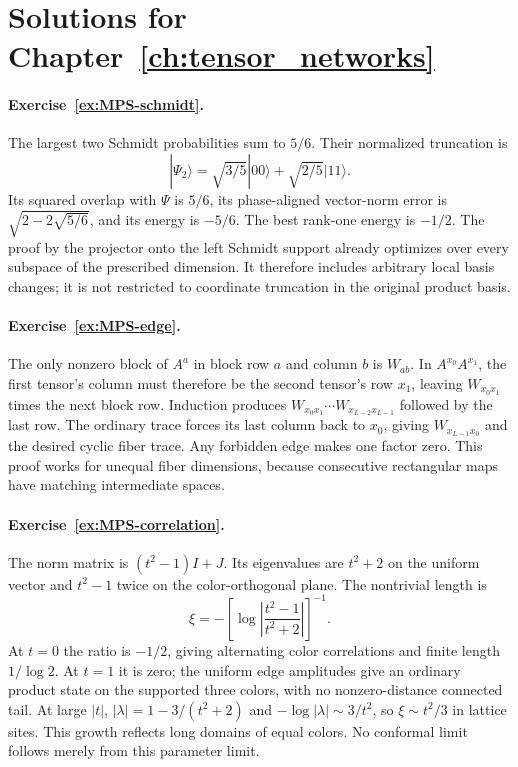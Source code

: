 \section{Solutions for Chapter~\ref{ch:tensor_networks}}

\paragraph{Exercise~\ref{ex:MPS-schmidt}.}
\label{sol:ex:MPS-schmidt}
The largest two Schmidt probabilities sum to $5/6$. Their
normalized truncation is
\[
 |\Psi_2\rangle=\sqrt{3/5}|00\rangle+\sqrt{2/5}|11\rangle.
\]
Its squared overlap with $\Psi$ is $5/6$, its phase-aligned
vector-norm error is $\sqrt{2-2\sqrt{5/6}}$, and its energy
is $-5/6$. The best rank-one energy is $-1/2$.
The proof by the projector onto the left Schmidt support
already optimizes over every subspace of the prescribed
dimension. It therefore includes arbitrary local basis
changes; it is not restricted to coordinate truncation in
the original product basis.



\paragraph{Exercise~\ref{ex:MPS-edge}.}
\label{sol:ex:MPS-edge}
The only nonzero block of $A^a$ in block row $a$ and column $b$
is $W_{ab}$. In $A^{x_0}A^{x_1}$, the first tensor's column
must therefore be the second tensor's row $x_1$, leaving
$W_{x_0x_1}$ times the next block row. Induction produces
$W_{x_0x_1}\cdots W_{x_{L-2}x_{L-1}}$ followed by the last
row. The ordinary trace forces its last column back to $x_0$,
giving $W_{x_{L-1}x_0}$ and the desired cyclic fiber trace.
Any forbidden edge makes one factor zero. This proof works
for unequal fiber dimensions, because consecutive rectangular
maps have matching intermediate spaces.



\paragraph{Exercise~\ref{ex:MPS-correlation}.}
\label{sol:ex:MPS-correlation}
The norm matrix is $(t^2-1)I+J$. Its eigenvalues are $t^2+2$
on the uniform vector and $t^2-1$ twice on the color-orthogonal
plane. The nontrivial length is
\[
 \xi=-\left[\log\left|\frac{t^2-1}{t^2+2}\right|\right]^{-1}.
\]
At $t=0$ the ratio is $-1/2$, giving alternating color
correlations and finite length $1/\log2$. At $t=1$ it is zero;
the uniform edge amplitudes give an ordinary product state on
the supported three colors, with no nonzero-distance connected tail.
At large $|t|$,
$|\lambda|=1-3/(t^2+2)$ and $-\log|\lambda|\sim3/t^2$,
so $\xi\sim t^2/3$ in lattice sites. This growth reflects long
domains of equal colors. No conformal limit follows merely from this parameter
limit.



